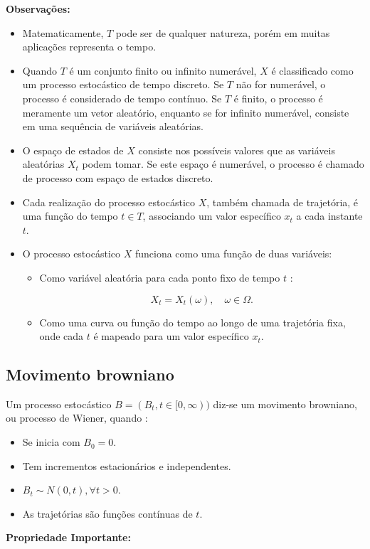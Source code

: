 \documentclass[12pt,openright,oneside,a4paper]{abntex2}
\numberwithin{equation}{section}
\begin{document}
\textbf{Observações:}
\begin{itemize}
    \item Matematicamente, $T$ pode ser de qualquer natureza, porém em muitas aplicações representa o tempo.
    \item Quando $T$ é um conjunto finito ou infinito numerável, $X$ é classificado como um processo estocástico de tempo discreto. Se $T$ não for numerável, o processo é considerado de tempo contínuo. Se $T$ é finito, o processo é meramente um vetor aleatório, enquanto se for infinito numerável, consiste em uma sequência de variáveis aleatórias.
    \item O espaço de estados de $X$ consiste nos possíveis valores que as variáveis aleatórias $X_t$ podem tomar. Se este espaço é numerável, o processo é chamado de processo com espaço de estados discreto.
    \item Cada realização do processo estocástico $X$, também chamada de trajetória, é uma função do tempo \( t \in T \), associando um valor específico \( x_t \) a cada instante \( t \).

    \item O processo estocástico $X$ funciona como uma função de duas variáveis:
    \begin{itemize}
        \item Como variável aleatória para cada ponto fixo de tempo $t$  \parencite[p.~23]{Mikosh}:
        
        
        $$X_t = X_t(\omega), \quad \omega \in \Omega.$$
        \item Como uma curva ou função do tempo ao longo de uma trajetória fixa, onde cada $t$ é mapeado para um valor específico $x_t$.
    \end{itemize}
\end{itemize}

\subsection{Movimento browniano}

Um processo estocástico $B = (B_t, t \in [0, \infty))$ diz-se um movimento browniano, ou processo de Wiener, quando \parencite [p.~33] {Mikosh}: 
\begin{itemize}
    \item Se inicia com $B_0 = 0$.
    \item Tem incrementos estacionários e independentes.
    \item $B_t \sim N(0, t), \forall t > 0$.
    \item As trajetórias são funções contínuas de $t$.
\end{itemize}
\textbf{Propriedade Importante:}
\end{document}
